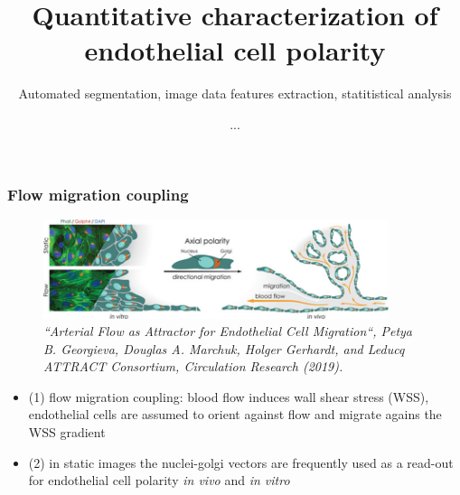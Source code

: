 \documentclass[14pt]{beamer}
\title{\large Quantitative characterization of endothelial cell polarity}
\subtitle{\small Automated segmentation, image data features extraction, statitistical analysis }
\author{\small ...}
\institute{MDC Berlin}
\begin{document}
\begin{frame}[plain]
\maketitle
\centering

\end{frame}

\begin{frame}[plain]
\frametitle{\normalsize \bf Flow migration coupling}

\centering


\begin{figure}
  \centering
  \includegraphics[width=0.9\textwidth]{images/leducq_attract.jpg}\\
  \tiny
   \textit{``Arterial Flow as Attractor for Endothelial Cell Migration``, Petya B. Georgieva, Douglas A. Marchuk, Holger Gerhardt, and Leducq ATTRACT Consortium, Circulation Research (2019).}
\end{figure}



\tiny

\begin{itemize}
 \item (1) flow migration coupling: blood flow induces wall shear stress (WSS), endothelial cells are assumed to orient against flow and migrate agains the WSS gradient
 \item (2) in static images the nuclei-golgi vectors are frequently used as a read-out for endothelial cell polarity \textit{in vivo} and \textit{in vitro}
\end{itemize}


\end{frame}
\end{document}
